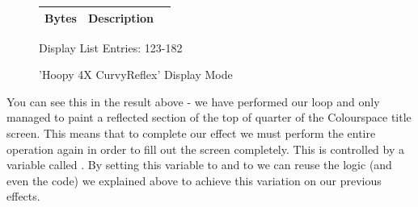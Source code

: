 \begin{minipage}[b]{0.31\linewidth}
  \begin{figure}[H]
    {
      \setlength{\tabcolsep}{3.0pt}
      \setlength\cmidrulewidth{\heavyrulewidth} %
      \begin{adjustbox}{height=8.5cm}

        \begin{tabular}{lll}
          \toprule
          Bytes       & Description                                                         \\
          \midrule
        \end{tabular}

      \end{adjustbox}

    }\caption*{Display List Entries: 123-182}
  \end{figure}
\end{minipage}

\clearpage
\begin{figure}[H]
    \centering
    \begin{adjustbox}{width=12cm,center}
    \end{adjustbox}
\caption{'Hoopy 4X CurvyReflex' Display Mode}
\end{figure}
You can see this in the result above - we have performed our loop and only managed to paint a reflected
section of the top of quarter of the Colourspace title screen. This means that to complete our effect
we must perform the entire operation again in order to fill out the screen completely.
This is controlled by a variable called .
By setting this variable to  and  to  we can reuse the logic (and
even the code) we explained above to achieve this variation on our previous effects.


